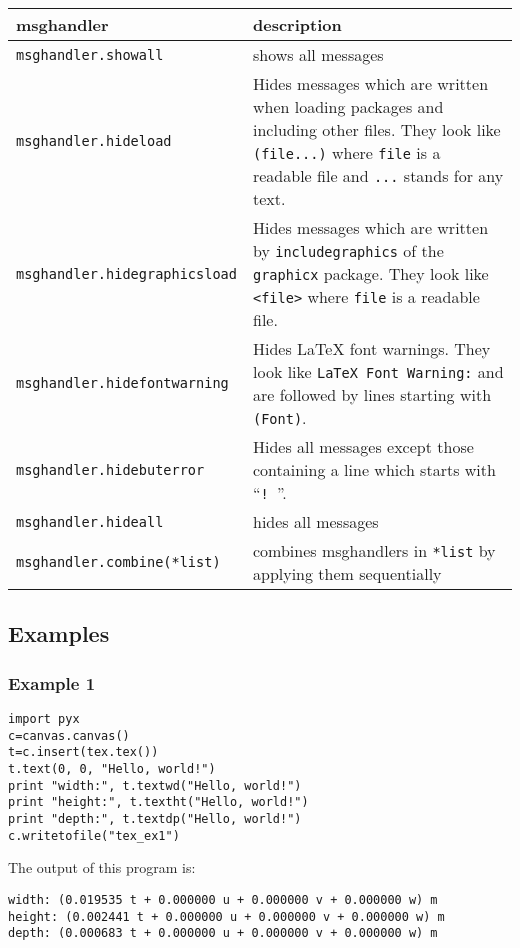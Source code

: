 \begin{description}
\bigskip
\begin{tabularx}{\linewidth}{l>{\raggedright\arraybackslash}X}
msghandler&description\\
\hline
\texttt{msghandler.showall}&shows all messages\\
\texttt{msghandler.hideload}&Hides messages which are written when loading
packages and including other files. They look like \texttt{(file...)}
where \texttt{file} is a readable file and \texttt{...} stands for any
text.\\
\texttt{msghandler.hidegraphicsload}&Hides messages which are written by
\texttt{includegraphics} of the \texttt{graphicx} package. They look like
\texttt{<file>} where \texttt{file} is a readable file.\\
\texttt{msghandler.hidefontwarning}&Hides \LaTeX{} font warnings. They
look like \texttt{LaTeX Font Warning:} and are followed by lines starting
with \texttt{(Font)}.\\
\texttt{msghandler.hidebuterror}&Hides all messages except those
containing a line which starts with ``\texttt{! }''.\\
\texttt{msghandler.hideall}&hides all messages\\
\texttt{msghandler.combine(*list)}&combines msghandlers in
\texttt{*list} by applying them sequentially\\
\end{tabularx}
\end{description}

\subsection{Examples}
\subsubsection{Example 1}
\begin{verbatim}
import pyx
c=canvas.canvas()
t=c.insert(tex.tex())
t.text(0, 0, "Hello, world!")
print "width:", t.textwd("Hello, world!")
print "height:", t.textht("Hello, world!")
print "depth:", t.textdp("Hello, world!")
c.writetofile("tex_ex1")
\end{verbatim}

The output of this program is:
\begin{verbatim}
width: (0.019535 t + 0.000000 u + 0.000000 v + 0.000000 w) m
height: (0.002441 t + 0.000000 u + 0.000000 v + 0.000000 w) m
depth: (0.000683 t + 0.000000 u + 0.000000 v + 0.000000 w) m
\end{verbatim}

